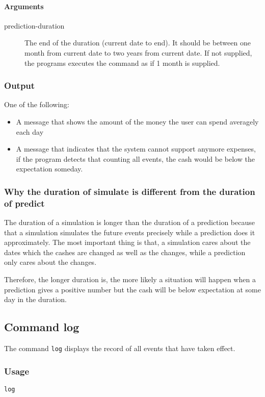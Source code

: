\paragraph{Arguments}
\begin{description}
	\item[prediction-duration] The end of the duration (current date to end). It should be between one month from current date to two years from current date. If not supplied, the programs executes the command as if 1 month is supplied.
\end{description}

\subsubsection{Output}
One of the following:
\begin{itemize}
	\item A message that shows the amount of the money the user can spend averagely each day
	\item A message that indicates that the system cannot support anymore expenses, if the program detects that counting all events, the cash would be below the expectation someday.
\end{itemize}

\subsubsection[simulate \& predict duration difference]{Why the duration of simulate is different from the duration of predict}
The duration of a simulation is longer than the duration of a prediction because that a simulation simulates the future events precisely while a prediction does it approximately. The most important thing is that, a simulation cares about the dates which the cashes are changed as well as the changes, while a prediction only cares about the changes.

Therefore, the longer duration is, the more likely a situation will happen when a prediction gives a positive number but the cash will be below expectation at some day in the duration.

\subsection{Command log}
The command \texttt{log} displays the record of all events that have taken effect.

\subsubsection{Usage}
\begin{center}
	\texttt{log} 
\end{center}

